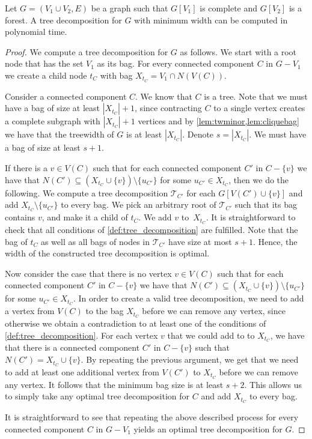 \documentclass[a4paper,UKenglish,cleveref, autoref, thm-restate, numberwithinsect]{lipics-v2021}
\begin{document}
\begin{lemma}\label{lem:twoneclique}
Let $G=(V_1\cup V_2,E)$ be a graph such that $G[V_1]$ is complete and $G[V_2]$ is a forest. A tree decomposition for $G$ with minimum width can be computed in polynomial time.
\end{lemma}
\begin{proof}
We compute a tree decomposition for $G$ as follows. We start with a root node that has the set $V_1$ as its bag. For every connected component $C$ in $G-V_1$ we create a child  node $t_C$ with bag $X_{t_C}=V_1\cap N(V(C))$. 

Consider a connected component $C$. We know that $C$ is a tree. Note that we must have a bag of size at least $|X_{t_C}|+1$, since contracting $C$ to a single vertex creates a complete subgraph with $|X_{t_C}|+1$ vertices and by \cref{lem:twminor,lem:cliquebag} we have that the treewidth of $G$ is at least $|X_{t_C}|$. Denote $s=|X_{t_C}|$. We must have a bag of size at least $s+1$.

If there is a $v\in V(C)$ such that for each connected component $C'$ in $C-\{v\}$ we have that $N(C')\subseteq (X_{t_C}\cup\{v\})\setminus \{u_{C'}\}$ for some $u_{C'}\in X_{t_C}$, then we do the following.
We compute a tree decomposition $\mathcal{T}_{C'}$ for each $G[V(C')\cup\{v\}]$ and add $X_{t_C}\setminus \{u_{C'}\}$ to every bag. We pick an arbitrary root of $\mathcal{T}_{C'}$ such that its bag contains $v$, and make it a child of $t_C$.
We add $v$ to~$X_{t_C}$.
It is straightforward to check that all conditions of \cref{def:tree_decomposition} are fulfilled.
Note that the bag of $t_C$ as well as all bags of nodes in $\mathcal{T}_{C'}$ have size at most $s+1$. Hence, the width of the constructed tree decomposition is optimal.

Now consider the case that there is no vertex $v\in V(C)$ such that for each connected component $C'$ in $C-\{v\}$ we have that $N(C')\subseteq (X_{t_C}\cup \{v\})\setminus \{u_{C'}\}$ for some $u_{C'}\in X_{t_C}$. 
In order to create a valid tree decomposition, we need to add a vertex from $V(C)$ to the bag $X_{t_C}$ before we can remove any vertex, since otherwise we obtain a contradiction to at least one of the conditions of \cref{def:tree_decomposition}.
For each vertex $v$ that we could add to to $X_{t_C}$, we have that there is a connected component $C'$ in $C-\{v\}$ such that $N(C')=X_{t_C}\cup\{v\}$. By repeating the previous argument, we get that we need to add at least one additional vertex from $V(C')$ to $X_{t_C}$ before we can remove any vertex. It follows that the minimum bag size is at least $s+2$. 
This allows us to simply take any optimal tree decomposition for $C$ and add $X_{t_C}$ to every bag. 

It is straightforward to see that repeating the above described process for every connected component $C$ in $G-V_1$ yields an optimal tree decomposition for $G$.
\end{proof}
\end{document}
